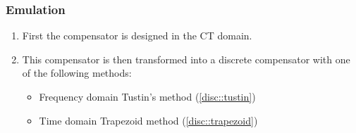\subsubsection{Emulation}
\begin{enumerate}
    \item First the compensator is designed in the CT domain.
    \item This compensator is then transformed into a discrete compensator with one of the following methods:
          \begin{itemize}
              \item Frequency domain \textrightarrow{} Tustin's method (\ref{disc::tustin})
              \item Time domain \textrightarrow{} Trapezoid method (\ref{disc::trapezoid})
          \end{itemize}
\end{enumerate}
